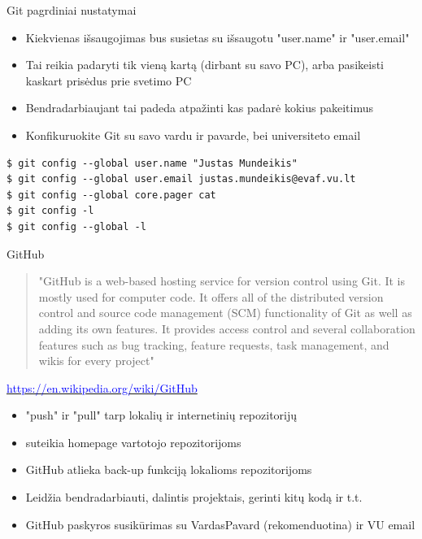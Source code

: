 \documentclass[11pt,xcolor=table]{beamer}
\begin{document}
\begin{frame}[fragile]{Git pagrdiniai nustatymai}
\begin{itemize}
\item Kiekvienas išsaugojimas bus susietas su išsaugotu "user.name" ir "user.email"
\item Tai reikia padaryti tik vieną kartą (dirbant su savo PC), arba pasikeisti kaskart prisėdus prie svetimo PC
\item Bendradarbiaujant tai padeda atpažinti kas padarė kokius pakeitimus
\item Konfikuruokite Git su savo vardu ir pavarde, bei universiteto email
\end{itemize}
\begin{lstlisting}
$ git config --global user.name "Justas Mundeikis"
$ git config --global user.email justas.mundeikis@evaf.vu.lt
$ git config --global core.pager cat 
$ git config -l
$ git config --global -l
\end{lstlisting}
\end{frame}
\begin{frame}{GitHub}
\begin{quote}
"GitHub  is a web-based hosting service for version control using Git. It is mostly used for computer code. It offers all of the distributed version control and source code management (SCM) functionality of Git as well as adding its own features. It provides access control and several collaboration features such as bug tracking, feature requests, task management, and wikis for every project"
\end{quote}
\href{https://en.wikipedia.org/wiki/GitHub}{\textcolor{blue}{https://en.wikipedia.org/wiki/GitHub}}

\begin{itemize}
\item "push" ir "pull" tarp lokalių ir internetinių repozitorijų
\item suteikia homepage vartotojo repozitorijoms
\item GitHub atlieka back-up funkciją lokalioms repozitorijoms
\item Leidžia bendradarbiauti, dalintis projektais, gerinti kitų kodą ir t.t.
\item GitHub paskyros susikūrimas su VardasPavard (rekomenduotina) ir VU email
\end{itemize}
\end{frame}
\end{document}
